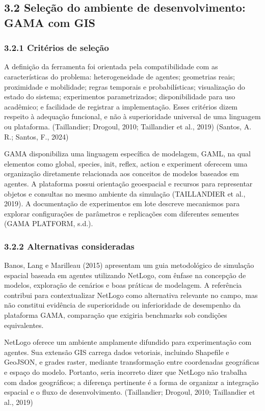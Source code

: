 \subsection{3.2 Seleção do ambiente de desenvolvimento: GAMA com
GIS}\label{seleuxe7uxe3o-do-ambiente-de-desenvolvimento-gama-com-gis}

\subsubsection{3.2.1 Critérios de
seleção}\label{crituxe9rios-de-seleuxe7uxe3o}

A definição da ferramenta foi orientada pela compatibilidade com as
características do problema: heterogeneidade de agentes; geometrias
reais; proximidade e mobilidade; regras temporais e probabilísticas;
visualização do estado do sistema; experimentos parametrizados;
disponibilidade para uso acadêmico; e facilidade de registrar a
implementação. Esses critérios dizem respeito à adequação funcional, e
não à superioridade universal de uma linguagem ou plataforma.
(Taillandier; Drogoul, 2010; Taillandier et al., 2019) (Santos, A. R.;
Santos, F., 2024)

GAMA disponibiliza uma linguagem específica de modelagem, GAML, na qual
elementos como global, species, init, reflex, action e experiment
oferecem uma organização diretamente relacionada aos conceitos de
modelos baseados em agentes. A plataforma possui orientação geoespacial
e recursos para representar objetos e consultas no mesmo ambiente da
simulação (TAILLANDIER et al., 2019). A documentação de experimentos em
lote descreve mecanismos para explorar configurações de parâmetros e
replicações com diferentes sementes (GAMA PLATFORM, s.d.).

\subsubsection{3.2.2 Alternativas
consideradas}\label{alternativas-consideradas}

Banos, Lang e Marilleau (2015) apresentam um guia metodológico de
simulação espacial baseada em agentes utilizando NetLogo, com ênfase na
concepção de modelos, exploração de cenários e boas práticas de
modelagem. A referência contribui para contextualizar NetLogo como
alternativa relevante no campo, mas não constitui evidência de
superioridade ou inferioridade de desempenho da plataforma GAMA,
comparação que exigiria benchmarks sob condições equivalentes.

NetLogo oferece um ambiente amplamente difundido para experimentação com
agentes. Sua extensão GIS carrega dados vetoriais, incluindo Shapefile e
GeoJSON, e grades raster, mediante transformação entre coordenadas
geográficas e espaço do modelo. Portanto, seria incorreto dizer que
NetLogo não trabalha com dados geográficos; a diferença pertinente é a
forma de organizar a integração espacial e o fluxo de desenvolvimento.
(Taillandier; Drogoul, 2010; Taillandier et al., 2019)

